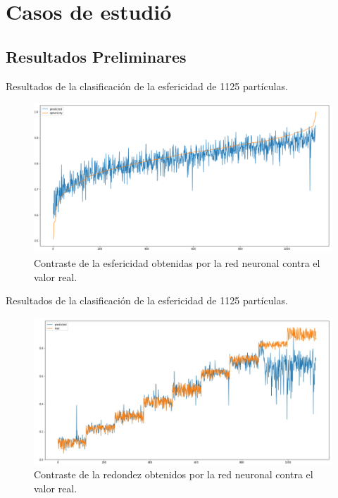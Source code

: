 
\chapter{Casos de estudió}

\section{Resultados Preliminares}

Resultados de la clasificación de la esfericidad de 1125 partículas.
\begin{figure}[H]
	\centering 
	\includegraphics[scale=1]{figuras/resultadosEsfericidad.png}
	\caption{Contraste de la esfericidad obtenidas por la red neuronal contra el valor real.}
\end{figure}

Resultados de la clasificación de la esfericidad de 1125 partículas.
\begin{figure}[H]
	\centering 
	\includegraphics[scale=1]{figuras/resultadosRedondez.jpg}
	\caption{Contraste de la redondez obtenidos por la red neuronal contra el valor real.}
\end{figure}